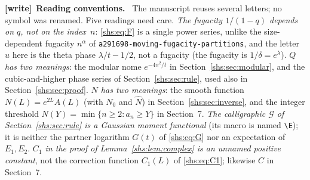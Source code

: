 \documentclass[11pt]{article}
\newcommand{\E}{\mathcal{G}}
\theoremstyle{definition}
\theoremstyle{plain}
\newenvironment{writenote}[1][]{\par\smallskip\begingroup\small
 \noindent\textbf{[write]}\if\relax\detokenize{#1}\relax\else~\textbf{#1.}\fi\ }%
 {\par\endgroup\smallskip}
\begin{document}
\begin{writenote}[Reading conventions]
The manuscript reuses several letters; no symbol was renamed. Five
readings need care. \emph{The fugacity $1/(1-q)$ depends on $q$, not on
the index~$n$}: \eqref{shs:eq:F} is a single power series, unlike the
size-dependent fugacity $n^\alpha$ of
\nolinkurl{a291698-moving-fugacity-partitions}, and the letter $u$ here is
the theta phase $\lambda/t-1/2$, not a fugacity (the fugacity is
$1/\delta=e^\lambda$). \emph{$Q$ has two meanings}: the modular nome
$e^{-4\pi^2/t}$ in Section~\ref{shs:sec:modular}, and the cubic-and-higher
phase series of Section~\ref{shs:sec:rule}, used also in
Section~\ref{shs:sec:proof}. \emph{$N$ has two meanings}: the smooth
function $N(L)=e^{2L}A(L)$ (with $N_0$ and $\widehat N$) in
Section~\ref{shs:sec:inverse}, and the integer threshold
$N(Y)=\min\{n\ge2:a_n\ge Y\}$ in Section~7. \emph{The calligraphic
$\mathcal G$ of Section~\ref{shs:sec:rule} is a Gaussian moment
functional} (its macro is named \verb|\E|); it is neither the partner
logarithm $G(t)$ of \eqref{shs:eq:G} nor an expectation of $E_1,E_2$.
\emph{$C_1$ in the proof of Lemma~\ref{shs:lem:complex} is an unnamed
positive constant}, not the correction function $C_1(L)$ of
\eqref{shs:eq:C1}; likewise $C$ in Section~7.


\end{writenote}
\end{document}
